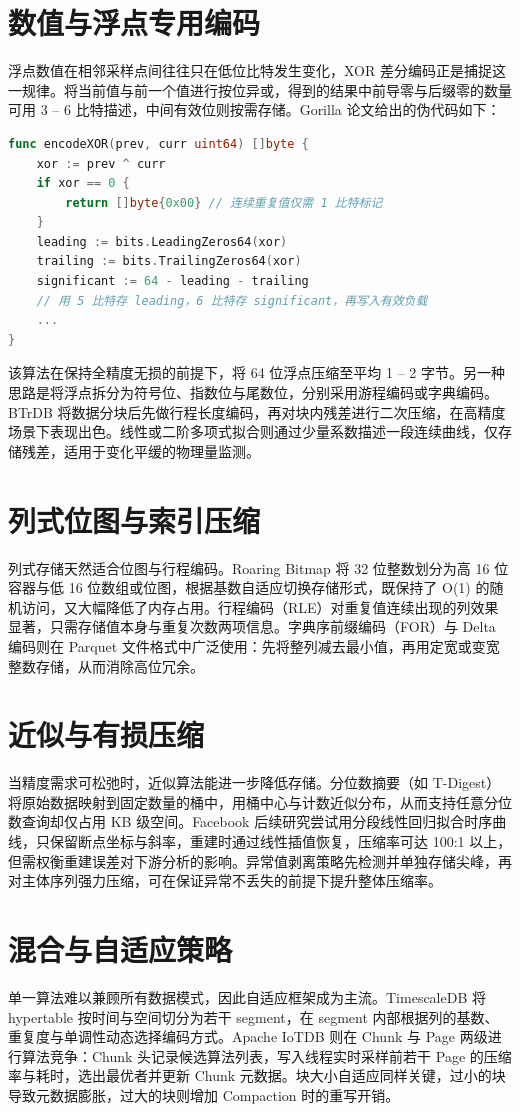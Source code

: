 \section{数值与浮点专用编码}
浮点数值在相邻采样点间往往只在低位比特发生变化，XOR 差分编码正是捕捉这一规律。将当前值与前一个值进行按位异或，得到的结果中前导零与后缀零的数量可用 3 – 6 比特描述，中间有效位则按需存储。Gorilla 论文给出的伪代码如下：\par
\begin{lstlisting}[language=go]
func encodeXOR(prev, curr uint64) []byte {
    xor := prev ^ curr
    if xor == 0 {
        return []byte{0x00} // 连续重复值仅需 1 比特标记
    }
    leading := bits.LeadingZeros64(xor)
    trailing := bits.TrailingZeros64(xor)
    significant := 64 - leading - trailing
    // 用 5 比特存 leading，6 比特存 significant，再写入有效负载
    ...
}
\end{lstlisting}
该算法在保持全精度无损的前提下，将 64 位浮点压缩至平均 1 – 2 字节。另一种思路是将浮点拆分为符号位、指数位与尾数位，分别采用游程编码或字典编码。BTrDB 将数据分块后先做行程长度编码，再对块内残差进行二次压缩，在高精度场景下表现出色。线性或二阶多项式拟合则通过少量系数描述一段连续曲线，仅存储残差，适用于变化平缓的物理量监测。\par
\section{列式位图与索引压缩}
列式存储天然适合位图与行程编码。Roaring Bitmap 将 32 位整数划分为高 16 位容器与低 16 位数组或位图，根据基数自适应切换存储形式，既保持了 O(1) 的随机访问，又大幅降低了内存占用。行程编码（RLE）对重复值连续出现的列效果显著，只需存储值本身与重复次数两项信息。字典序前缀编码（FOR）与 Delta 编码则在 Parquet 文件格式中广泛使用：先将整列减去最小值，再用定宽或变宽整数存储，从而消除高位冗余。\par
\section{近似与有损压缩}
当精度需求可松弛时，近似算法能进一步降低存储。分位数摘要（如 T-Digest）将原始数据映射到固定数量的桶中，用桶中心与计数近似分布，从而支持任意分位数查询却仅占用 KB 级空间。Facebook 后续研究尝试用分段线性回归拟合时序曲线，只保留断点坐标与斜率，重建时通过线性插值恢复，压缩率可达 100:1 以上，但需权衡重建误差对下游分析的影响。异常值剥离策略先检测并单独存储尖峰，再对主体序列强力压缩，可在保证异常不丢失的前提下提升整体压缩率。\par
\section{混合与自适应策略}
单一算法难以兼顾所有数据模式，因此自适应框架成为主流。TimescaleDB 将 hypertable 按时间与空间切分为若干 segment，在 segment 内部根据列的基数、重复度与单调性动态选择编码方式。Apache IoTDB 则在 Chunk 与 Page 两级进行算法竞争：Chunk 头记录候选算法列表，写入线程实时采样前若干 Page 的压缩率与耗时，选出最优者并更新 Chunk 元数据。块大小自适应同样关键，过小的块导致元数据膨胀，过大的块则增加 Compaction 时的重写开销。\par
